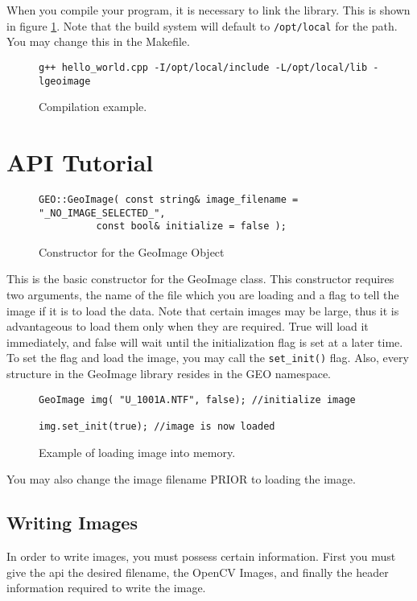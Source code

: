 \documentclass[10pt]{report}
\begin{document}
When you compile your program, it is necessary to link the library. This
is shown in figure \ref{fig:basic02}.  Note that the build system will 
default to \texttt{/opt/local} for the path.  You may change this in the Makefile.


\begin{figure}[!h]
\begin{verbatim}
g++ hello_world.cpp -I/opt/local/include -L/opt/local/lib -lgeoimage
\end{verbatim}
\caption{Compilation example.}
\label{fig:basic02}
\end{figure}



\section*{API Tutorial}

\begin{figure}[!h]
\begin{lstlisting}
GEO::GeoImage( const string& image_filename = "_NO_IMAGE_SELECTED_", 
          const bool& initialize = false );
\end{lstlisting}
\caption{Constructor for the GeoImage Object}
\label{fig:geoimage01}
\end{figure}

This is the basic constructor for the GeoImage class.  This constructor requires two arguments, 
the name of the file which you are loading and a flag to tell the image if it is to load the
data.  Note that certain images may be large, thus it is advantageous to load them only when they 
are required.  True will load it immediately, and false will wait until the initialization flag
is set at a later time. To set the flag and load the image, you may call the \texttt{set\_init()}
flag. Also, every structure in the GeoImage library resides in the GEO namespace.

\begin{figure}[!h]
\begin{lstlisting}
GeoImage img( "U_1001A.NTF", false); //initialize image

img.set_init(true); //image is now loaded
\end{lstlisting}
\caption{Example of loading image into memory.}
\label{fig:geoimage02}
\end{figure}

You may also change the image filename PRIOR to loading the image. 

\subsection*{Writing Images}
In order to write images, you must possess certain information.  First you must 
give the api the desired filename, the OpenCV Images, and finally the header information
required to write the image.
\end{document}
